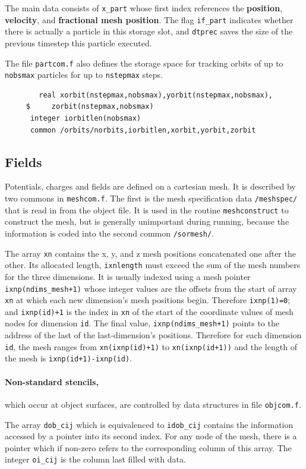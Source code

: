 \documentclass[12pt]{article}
\begin{document}
The main data consists of \verb!x_part! whose first index references
the {\bf position}, {\bf velocity}, and {\bf fractional mesh
  position}. The flag \verb!if_part! indicates whether there is actually
a particle in this storage slot, and \verb!dtprec! saves the size of
the previous timestep this particle executed.

The file \verb!partcom.f! also defines the storage space for tracking
orbits of up to \verb!nobsmax! particles for up to \verb!nstepmax! steps.
\begin{verbatim}
        real xorbit(nstepmax,nobsmax),yorbit(nstepmax,nobsmax),
     $     zorbit(nstepmax,nobsmax)
      integer iorbitlen(nobsmax)
      common /orbits/norbits,iorbitlen,xorbit,yorbit,zorbit
\end{verbatim}


\subsection{Fields}

Potentials, charges and fields are defined on a cartesian mesh. It is
described by two commons in \verb!meshcom.f!. The first is the mesh
specification data \verb!/meshspec/! that is read in from the object file.
It is used in the routine \verb!meshconstruct! to construct the mesh,
but is generally unimportant during running, because the information
is coded into the second common \verb!/sormesh/!.
 

The array \verb!xn! contains the x, y, and z mesh positions
concatenated one after the other. Its allocated length,
\verb!ixnlength! must exceed the sum of the mesh numbers for the three
dimensions. It is usually indexed using a mesh pointer
\verb!ixnp(ndims_mesh+1)! whose integer values are the offsets from
the start of array \verb!xn! at which each new dimension's mesh
positions begin. Therefore \verb!ixnp(1)=0!; and \verb!ixnp(id)+1! is
the index in \verb!xn! of the start of the coordinate values of mesh nodes
for dimension \verb!id!. The final value, \verb!ixnp(ndims_mesh+1)!
points to the address of the last of the last-dimension's
positions. Therefore for each dimension \verb!id!, the mesh ranges
from \verb!xn(ixnp(id)+1)!  to \verb!xn(ixnp(id+1))!  and the length
of the mesh is \verb!ixnp(id+1)-ixnp(id)!.

\paragraph{Non-standard stencils,} which occur at object surfaces,
are controlled by data structures in file \verb!objcom.f!. 

The array \verb!dob_cij! which is equivalenced to \verb!idob_cij!
contains the information accessed by a pointer into its second index.
For any node of the mesh, there is a pointer which if non-zero refers
to the corresponding column of this array. The integer
\verb!oi_cij! is the column last filled with data. 
\end{document}
